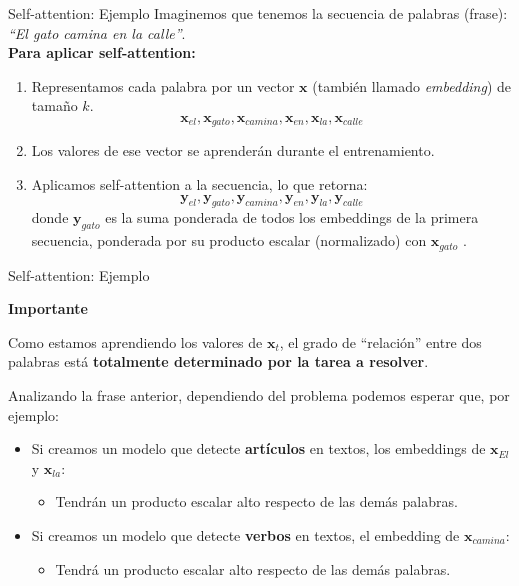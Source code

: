 \documentclass[aspectratio=169]{beamer}
\newenvironment{blockm}[1]{%
  \begin{block}{\textbf{#1}}%
  }{%
  \end{block}%
  \vspace{1em}%
}
\begin{document}
\begin{frame}{Self-attention: Ejemplo}
  \vspace{.3cm}
  Imaginemos que tenemos la secuencia de palabras (frase): \textit{``El gato camina en la calle''}.\\
  \vspace{.3cm}
  \textbf{Para aplicar self-attention:}
  \begin{enumerate}
    \item Representamos cada palabra por un vector $\mathbf{x}$ (también llamado \textit{embedding}) de tamaño $k$.
    \begin{equation*}
      \mathbf{x}_{el}, \mathbf{x}_{gato}, \mathbf{x}_{camina}, \mathbf{x}_{en}, \mathbf{x}_{la}, \mathbf{x}_{calle}
    \end{equation*}
    \item Los valores de ese vector se aprenderán durante el entrenamiento. 
    \item Aplicamos self-attention a la secuencia, lo que retorna:
    \begin{equation*}
      \mathbf{y}_{el}, \mathbf{y}_{gato}, \mathbf{y}_{camina}, \mathbf{y}_{en}, \mathbf{y}_{la}, \mathbf{y}_{calle}
    \end{equation*}
    donde $\mathbf{y}_{gato}$ es la suma ponderada de todos los embeddings de la primera secuencia, ponderada por su producto escalar (normalizado) con $\mathbf{x}_{gato}$ .
  \end{enumerate}

\end{frame}

\begin{frame}{Self-attention: Ejemplo}

  \begin{blockm}{Importante}
    Como estamos aprendiendo los valores de $ \mathbf{x}_{t} $, el grado de ``relación'' entre dos palabras está \textbf{totalmente determinado por la tarea a resolver}.
  \end{blockm}

  Analizando la frase anterior, dependiendo del problema podemos esperar que, por ejemplo:

  \begin{itemize}
    \item Si creamos un modelo que detecte \textbf{artículos} en textos, los embeddings de $\mathbf{x}_{El}$ y $\mathbf{x}_{la}$:
    \begin{itemize}
      \item Tendrán un producto escalar alto respecto de las demás palabras.
    \end{itemize}
    \item Si creamos un modelo que detecte \textbf{verbos} en textos, el embedding de $\mathbf{x}_{camina}$:
    \begin{itemize}
      \item Tendrá un producto escalar alto respecto de las demás palabras.
    \end{itemize}
  \end{itemize}

\end{frame}
\end{document}
